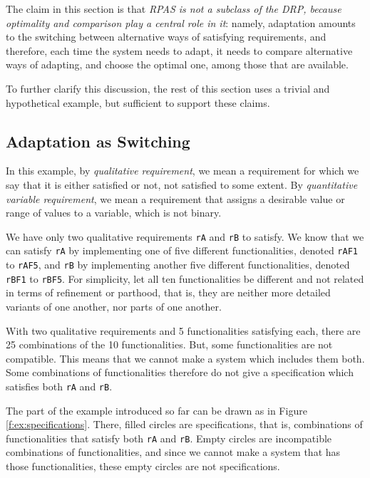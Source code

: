 \documentclass[graybox]{svmult}
\newcommand{\zi}[1]{\textit{#1}}
\newcommand{\xt}[1]{\texttt{#1}}
\newcommand{\req}[1]{\xt{#1}}
\newcommand{\RPAS}{RPAS}
\newcommand{\ZJRP}{DRP}
\begin{document}
The claim in this section is that \zi{\RPAS{} is not a subclass of the \ZJRP, because optimality and comparison play a central role in it}: namely, adaptation amounts to the switching between alternative ways of satisfying requirements, and therefore, each time the system needs to adapt, it needs to compare alternative ways of adapting, and choose the optimal one, among those that are available.

To further clarify this discussion, the rest of this section uses a trivial and hypothetical example, but sufficient to support these claims.


%
\subsection{Adaptation as Switching}\label{s:optimality-criteria-importance:switching}
In this example, by \zi{qualitative requirement}, we mean a requirement for which we say that it is either satisfied or not, not satisfied to some extent. By \zi{quantitative variable requirement}, we mean a requirement that assigns a desirable value or range of values to a variable, which is not binary. 

We have only two qualitative requirements \req{rA} and \req{rB} to satisfy. We know that we can satisfy \req{rA} by implementing one of five different functionalities, denoted \req{rAF1} to \req{rAF5}, and \req{rB} by implementing another five different functionalities, denoted \req{rBF1} to \req{rBF5}. For simplicity, let all ten functionalities be different and not related in terms of refinement or parthood, that is, they are neither more detailed variants of one another, nor parts of one another. 

With two qualitative requirements and 5 functionalities satisfying each, there are 25 combinations of the 10 functionalities. But, some functionalities are not compatible. This means that we cannot make a system which includes them both. Some combinations of functionalities therefore do not give a specification which satisfies both \req{rA} and \req{rB}. 

The part of the example introduced so far can be drawn as in Figure \ref{f:ex:specifications}. There, filled circles are specifications, that is, combinations of functionalities that satisfy both \req{rA} and \req{rB}. Empty circles are incompatible combinations of functionalities, and since we cannot make a system that has those functionalities, these empty circles are not specifications.
\end{document}
